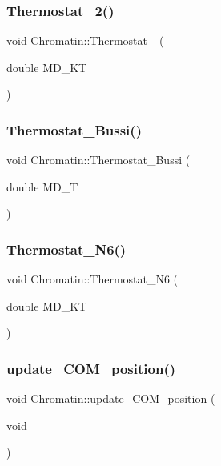 \subsubsection{\texorpdfstring{Thermostat\_2()}{Thermostat\_2()}}
{\footnotesize\ttfamily void Chromatin\+::\+Thermostat\+\_ (\begin{DoxyParamCaption}\item[{double}]{M\+D\+\_\+\+KT }\end{DoxyParamCaption})}

\mbox{\label{classChromatin_a0ab8a63487a5f0a955e0e72a67202687}} 
\subsubsection{\texorpdfstring{Thermostat\_Bussi()}{Thermostat\_Bussi()}}
{\footnotesize\ttfamily void Chromatin\+::\+Thermostat\+\_\+\+Bussi (\begin{DoxyParamCaption}\item[{double}]{M\+D\+\_\+T }\end{DoxyParamCaption})}

\mbox{\label{classChromatin_a1bdebb39143cec34dcf0d4f9b5252a71}} 
\subsubsection{\texorpdfstring{Thermostat\_N6()}{Thermostat\_N6()}}
{\footnotesize\ttfamily void Chromatin\+::\+Thermostat\+\_\+\+N6 (\begin{DoxyParamCaption}\item[{double}]{M\+D\+\_\+\+KT }\end{DoxyParamCaption})}

\mbox{\label{classChromatin_a95a89f98d688ff8ca440fbef34086199}} 
\subsubsection{\texorpdfstring{update\_COM\_position()}{update\_COM\_position()}}
{\footnotesize\ttfamily void Chromatin\+::update\+\_\+\+C\+O\+M\+\_\+position (\begin{DoxyParamCaption}\item[{void}]{ }\end{DoxyParamCaption})\hspace{0.3cm}{\ttfamily [inline]}}

